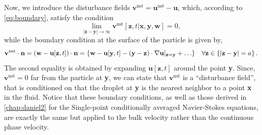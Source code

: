 Now, we introduce the disturbance fields $\textbf{v}^\text{nst} = \textbf{u}^\text{nst} - \textbf{u}$, which, according to  \ref{eq:boundary}, satisfy the condition
\begin{equation}
    \lim_{|\textbf{z} - \textbf{y}|\to \infty}
    \textbf{v}^\text{nst}[\textbf{z},t|\textbf{x},\textbf{y},\textbf{w}]
    = 0,
\end{equation}
while the boundary condition at the surface of the particle is given by, 
\begin{equation}
    \textbf{v}^\text{nst}\cdot \textbf{n}
    = 
    (\textbf{w} - \textbf{u}[\textbf{z},t])\cdot \textbf{n}
    = 
    \left\{
        \textbf{w}
        - \textbf{u}[\textbf{y},t]
        - (\textbf{y} - \textbf{z})\cdot \grad\textbf{u}|_{\textbf{z}=\textbf{y}}
        + \ldots 
    \right\}
    \;\;\; \forall \textbf{z}\in \left\{ |\textbf{z} - \textbf{y}| = a  \right\}. 
    \label{eq:bounday2}
\end{equation}
The second equality is obtained by expanding $ \textbf{u}[\textbf{z},t]$ around the point \textbf{y}. 
Since, $\textbf{v}^\text{nst} = 0$ far from the particle at \textbf{y}, we can state that  $\textbf{v}^\text{nst}$ is a ``disturbance field'', that is conditioned on that the droplet at \textbf{y} is the nearest neighbor to a point \textbf{x} in the fluid. 
Notice that these boundary conditions, as well as those derived in \ref{chap:daniel2} for the Single-point conditionally averaged Navier-Stokes equations, are exactly the same but applied to the bulk velocity rather than the continuous phase velocity.

